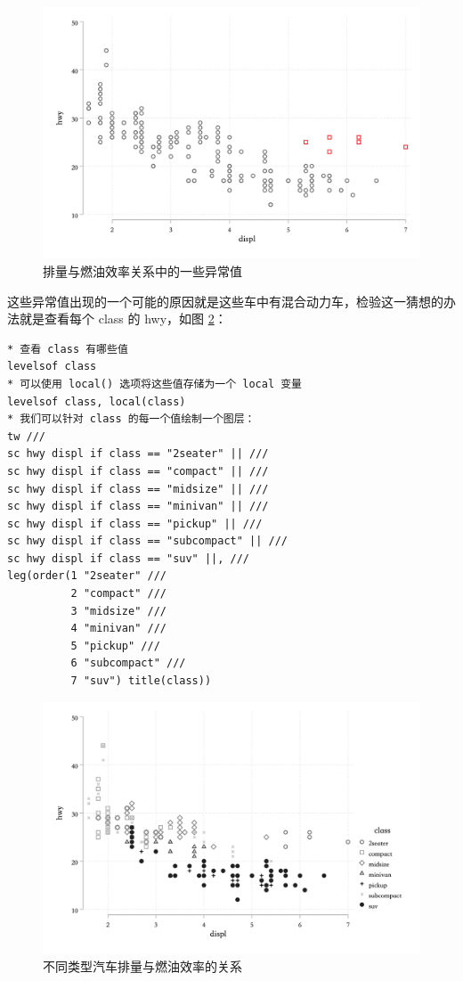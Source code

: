 \begin{figure}[htbp]
  \centering
  \includegraphics[width=\textwidth]{assets/hwydispl2.png}
  \caption{排量与燃油效率关系中的一些异常值}
  \label{fig:hwydispl2}
\end{figure}

这些异常值出现的一个可能的原因就是这些车中有混合动力车，检验这一猜想的办法就是查看每个 class 的 hwy，如图 \ref{fig:hwydispl3}：

\begin{lstlisting}
* 查看 class 有哪些值
levelsof class
* 可以使用 local() 选项将这些值存储为一个 local 变量
levelsof class, local(class)
* 我们可以针对 class 的每一个值绘制一个图层：
tw ///
sc hwy displ if class == "2seater" || ///
sc hwy displ if class == "compact" || ///
sc hwy displ if class == "midsize" || ///
sc hwy displ if class == "minivan" || ///
sc hwy displ if class == "pickup" || ///
sc hwy displ if class == "subcompact" || ///
sc hwy displ if class == "suv" ||, ///
leg(order(1 "2seater" ///
          2 "compact" ///
          3 "midsize" ///
          4 "minivan" ///
          5 "pickup" ///
          6 "subcompact" ///
          7 "suv") title(class))
\end{lstlisting}

\begin{figure}[htbp]
  \centering
  \includegraphics[width=\textwidth]{assets/hwydispl3.png}
  \caption{不同类型汽车排量与燃油效率的关系}
  \label{fig:hwydispl3}
\end{figure}

